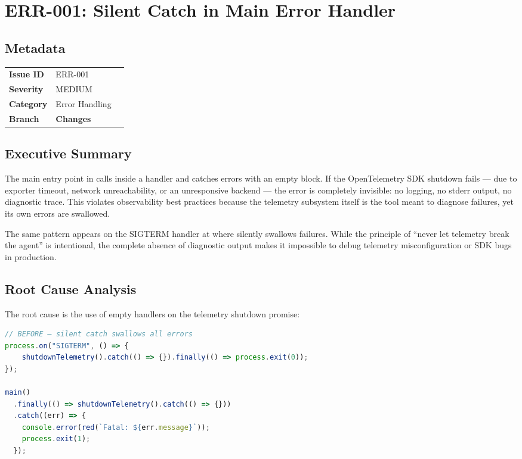 \section{ERR-001: Silent Catch in Main Error Handler}
\label{sec:err-001}
\subsection*{Metadata}
\begin{tabular}{ll}
\textbf{Issue ID} & ERR-001 \\
\textbf{Severity} & MEDIUM \\
\textbf{Category} & Error Handling \\
\textbf{Branch} & 
\textbf{Changes} &  \\
\end{tabular}

\subsection*{Executive Summary}
The main entry point in  calls  inside a  handler and catches errors with an empty  block. If the OpenTelemetry SDK shutdown fails — due to exporter timeout, network unreachability, or an unresponsive backend — the error is completely invisible: no logging, no stderr output, no diagnostic trace. This violates observability best practices because the telemetry subsystem itself is the tool meant to diagnose failures, yet its own errors are swallowed.

The same pattern appears on the SIGTERM handler at  where  silently swallows failures. While the principle of ``never let telemetry break the agent'' is intentional, the complete absence of diagnostic output makes it impossible to debug telemetry misconfiguration or SDK bugs in production.

\subsection*{Root Cause Analysis}
The root cause is the use of empty  handlers on the telemetry shutdown promise:

\begin{lstlisting}[language=TypeScript]
// BEFORE — silent catch swallows all errors
process.on("SIGTERM", () => {
    shutdownTelemetry().catch(() => {}).finally(() => process.exit(0));
});

main()
  .finally(() => shutdownTelemetry().catch(() => {}))
  .catch((err) => {
    console.error(red(`Fatal: ${err.message}`));
    process.exit(1);
  });
\end{lstlisting}

